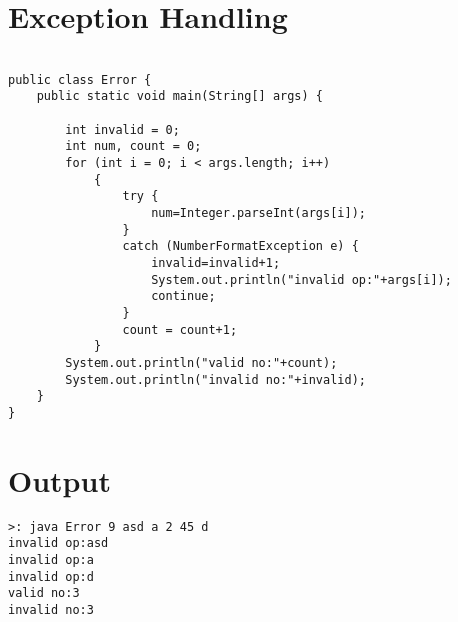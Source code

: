 \pagebreak{}
\section{Exception Handling}
\begin{verbatim}

public class Error {
    public static void main(String[] args) {

        int invalid = 0;
        int num, count = 0;
        for (int i = 0; i < args.length; i++)
            {
                try {
                    num=Integer.parseInt(args[i]);
                }
                catch (NumberFormatException e) {
                    invalid=invalid+1;
                    System.out.println("invalid op:"+args[i]);
                    continue;
                }
                count = count+1;
            }
        System.out.println("valid no:"+count);
        System.out.println("invalid no:"+invalid);
    }
}
\end{verbatim}
\section*{Output}
\begin{verbatim}
>: java Error 9 asd a 2 45 d
invalid op:asd
invalid op:a
invalid op:d
valid no:3
invalid no:3
\end{verbatim}